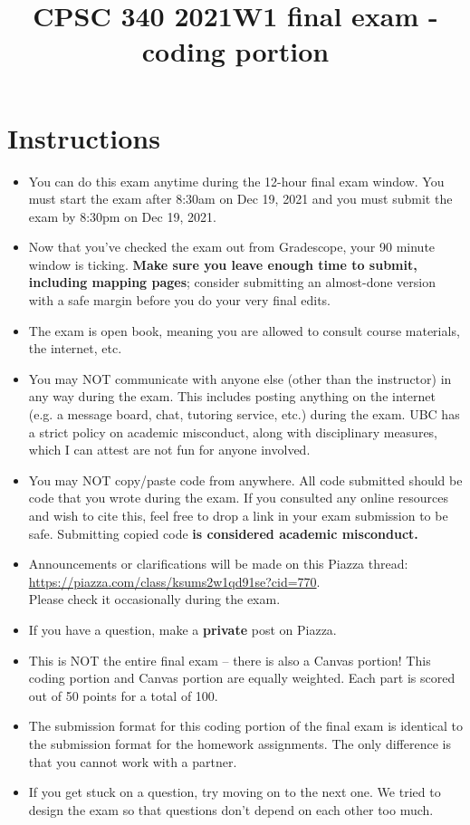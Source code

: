 \documentclass{article}
\begin{document}
\title{CPSC 340 2021W1 final exam - coding portion}
\date{}
\maketitle

\vspace{-5em}


\section*{Instructions}

\begin{itemize}
\item You can do this exam anytime during the 12-hour final exam window. You must start the exam after 8:30am on Dec 19, 2021 and you must submit the exam by 8:30pm on Dec 19, 2021.
\item Now that you've checked the exam out from Gradescope, your 90 minute window is ticking. \textbf{Make sure you leave enough time to submit, including mapping pages}; consider submitting an almost-done version with a safe margin before you do your very final edits.
\item The exam is open book, meaning you are allowed to consult course materials, the internet, etc.
\item You may NOT communicate with anyone else (other than the instructor) in any way during the exam. This includes posting anything on the internet (e.g. a message board, chat, tutoring service, etc.) during the exam. UBC has a strict policy on academic misconduct, along with disciplinary measures, which I can attest are not fun for anyone involved.
\item You may NOT copy/paste code from anywhere. All code submitted should be code that you wrote during the exam. If you consulted any online resources and wish to cite this, feel free to drop a link in your exam submission to be safe. Submitting copied code \textbf{is considered academic misconduct.}
\item Announcements or clarifications will be made on this Piazza thread: \\ \url{https://piazza.com/class/ksums2w1qd91se?cid=770}. \\Please check it occasionally during the exam.
\item If you have a question, make a \textbf{private} post on Piazza.
\item This is NOT the entire final exam -- there is also a Canvas portion! This coding portion and Canvas portion are equally weighted. Each part is scored out of 50 points for a total of 100.
\item The submission format for this coding portion of the final exam is identical to the submission format for the homework assignments. The only difference is that you cannot work with a partner.
\item If you get stuck on a question, try moving on to the next one. We tried to design the exam so that questions don't depend on each other too much.
\end{itemize}
\end{document}
